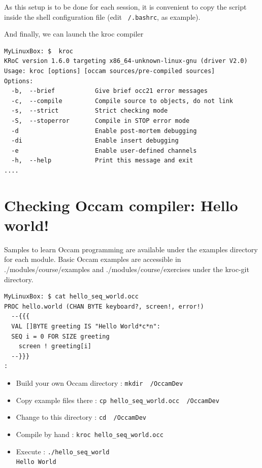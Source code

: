 \documentclass[times]{book}
\begin{document}
\begin{enumerate}
As this setup is to be done for each session, it is convenient to copy the script
inside the shell configuration file (edit {\tt ~/.bashrc}, as example).


And finally, we can launch the kroc compiler
\begin{lstlisting} 
MyLinuxBox: $  kroc
KRoC version 1.6.0 targeting x86_64-unknown-linux-gnu (driver V2.0)
Usage: kroc [options] [occam sources/pre-compiled sources]
Options:
  -b,  --brief           Give brief occ21 error messages
  -c,  --compile         Compile source to objects, do not link
  -s,  --strict          Strict checking mode
  -S,  --stoperror       Compile in STOP error mode
  -d                     Enable post-mortem debugging
  -di                    Enable insert debugging
  -e                     Enable user-defined channels
  -h,  --help            Print this message and exit
....
\end{lstlisting} 


\end{enumerate}

\section{Checking Occam compiler: Hello world! }

Samples to learn Occam programming are available under the examples directory
for each module. Basic Occam examples are accessible in ./modules/course/examples
and ./modules/course/exercises
under  the kroc-git directory.

\begin{lstlisting} 
MyLinuxBox: $ cat hello_seq_world.occ
PROC hello.world (CHAN BYTE keyboard?, screen!, error!)
  --{{{
  VAL []BYTE greeting IS "Hello World*c*n":
  SEQ i = 0 FOR SIZE greeting
    screen ! greeting[i]
  --}}}
:
\end{lstlisting} 

\begin{itemize}
\item Build your own Occam directory : {\tt mkdir ~/OccamDev }
\item Copy example files there : {\tt cp hello\_seq\_world.occ ~/OccamDev }
\item Change to this directory :  {\tt cd ~/OccamDev }
\item Compile by hand : {\tt kroc hello\_seq\_world.occ }
\item Execute : {\tt  ./hello\_seq\_world \\
Hello World
}
\end{itemize}
\end{document}
